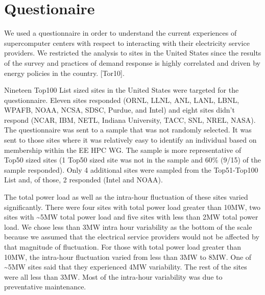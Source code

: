 \documentclass{llncs}
\begin{document}
\section{Questionaire} 
We used a questionnaire in order to understand the current experiences of
supercomputer centers with respect to interacting with their electricity
service providers. We restricted the analysis to sites in the United States
since the results of the survey and practices of demand response is highly
correlated and driven by energy policies in the country. [Tor10].

Nineteen Top100 List sized sites in the United States were targeted for the
questionnaire. Eleven sites responded (ORNL, LLNL, ANL, LANL, LBNL, WPAFB,
NOAA, NCSA, SDSC, Purdue, and Intel) and eight sites didn't respond (NCAR,
IBM, NETL, Indiana University, TACC, SNL, NREL, NASA). The questionnaire was
sent to a sample that was not randomly selected. It was sent to those sites
where it was relatively easy to identify an individual based on membership
within the EE HPC WG. The sample is more representative of Top50 sized sites
(1 Top50 sized site was not in the sample and 60{\%} (9/15) of the sample
responded). Only 4 additional sites were sampled from the Top51-Top100 List
and, of those, 2 responded (Intel and NOAA).

The total power load as well as the intra-hour fluctuation of these sites
varied significantly. There were four sites with total power load greater
than 10MW, two sites with \textasciitilde 5MW total power load and five
sites with less than 2MW total power load. We chose less than 3MW intra hour
variability as the bottom of the scale because we assumed that the
electrical service providers would not be affected by that magnitude of
fluctuation. For those with total power load greater than 10MW, the
intra-hour fluctuation varied from less than 3MW to 8MW. One of
\textasciitilde 5MW sites said that they experienced 4MW variability. The
rest of the sites were all less than 3MW. Most of the intra-hour variability
was due to preventative maintenance.
\end{document}
